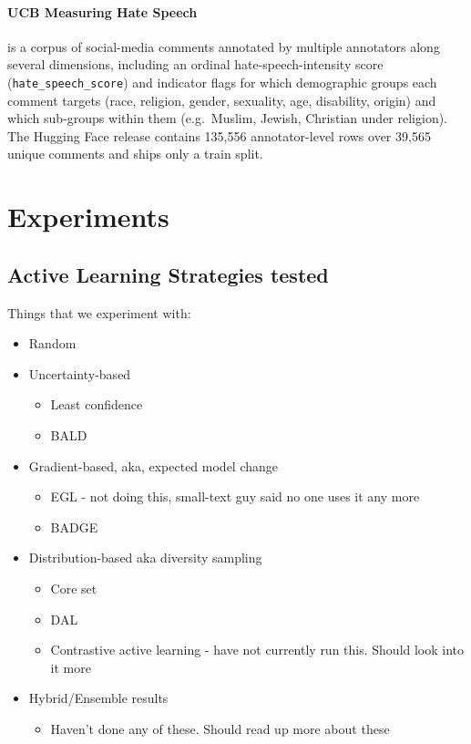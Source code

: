 \documentclass[11pt]{article}
\begin{document}
\paragraph{UCB Measuring Hate Speech} \citep{sachdeva2022measuring} is a corpus of social-media comments annotated by multiple annotators along several dimensions, including an ordinal hate-speech-intensity score (\texttt{hate\_speech\_score}) and indicator flags for which demographic groups each comment targets (race, religion, gender, sexuality, age, disability, origin) and which sub-groups within them (e.g.\ Muslim, Jewish, Christian under religion). The Hugging Face release contains 135{,}556 annotator-level rows over 39{,}565 unique comments and ships only a train split.


\section{Experiments}

\subsection{Active Learning Strategies tested}

Things that we experiment with:

\begin{itemize}
    \item Random
    \item Uncertainty-based
    \begin{itemize}
        \item Least confidence \citep{DBLP:journals/corr/LewisG94}
        \item BALD \citep{houlsby2011bayesian, pmlr-v48-gal16}
    \end{itemize}
    \item Gradient-based, aka, expected model change
    \begin{itemize}
        \item EGL \citep{DBLP:journals/corr/HuangCRLSC16} - not doing this, small-text guy said no one uses it any more
        \item BADGE \citep{DBLP:journals/corr/abs-1906-03671}
    \end{itemize}
    \item Distribution-based aka diversity sampling 
    \begin{itemize}
        \item Core set  \citep{sener2018active, DBLP:journals/corr/abs-1711-00941}
        \item DAL \citep{DBLP:journals/corr/abs-1907-06347}
        \item Contrastive active learning \cite{margatina-etal-2021-active} - have not currently run this. Should look into it more
    \end{itemize}
    \item Hybrid/Ensemble results
    \begin{itemize}
        \item Haven't done any of these. Should read up more about these
    \end{itemize}
\end{itemize}
\end{document}
